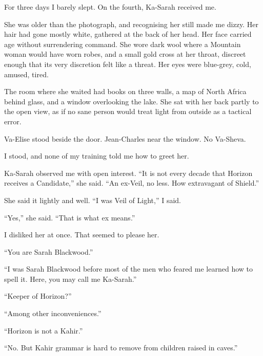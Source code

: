 For three days I barely slept. On the fourth, Ka-Sarah received me.\par

She was older than the photograph, and recognising her still made me dizzy. Her hair had gone mostly white, gathered at the back of her head. Her face carried age without surrendering command. She wore dark wool where a Mountain woman would have worn robes, and a small gold cross at her throat, discreet enough that its very discretion felt like a threat. Her eyes were blue-grey, cold, amused, tired.\par

The room where she waited had books on three walls, a map of North Africa behind glass, and a window overlooking the lake. She sat with her back partly to the open view, as if no sane person would treat light from outside as a tactical error.\par

Va-Elise stood beside the door. Jean-Charles near the window. No Va-Sheva.\par

I stood, and none of my training told me how to greet her.\par

Ka-Sarah observed me with open interest. ``It is not every decade that Horizon receives a Candidate,'' she said. ``An ex-Veil, no less. How extravagant of Shield.''\par

She said it lightly and well. ``I was Veil of Light,'' I said.\par

``Yes,'' she said. ``That is what ex means.''\par

I disliked her at once. That seemed to please her.\par

``You are Sarah Blackwood.''\par

``I was Sarah Blackwood before most of the men who feared me learned how to spell it. Here, you may call me Ka-Sarah.''\par

``Keeper of Horizon?''\par

``Among other inconveniences.''\par

``Horizon is not a Kahir.''\par

``No. But Kahir grammar is hard to remove from children raised in caves.''\par

